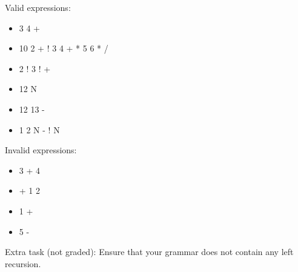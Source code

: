 Valid expressions:
\begin{itemize}
\item 3 4 +
\item 10 2 + ! 3 4 + * 5 6 * /
\item 2 ! 3 ! +
\item 12 N
\item 12 13 -
\item 1 2 N - ! N
\end{itemize}

Invalid expressions:
\begin{itemize}
\item 3 + 4
\item + 1 2
\item 1 +
\item 5 -
\end{itemize}

Extra task (not graded): Ensure that your grammar does not contain any left recursion.


